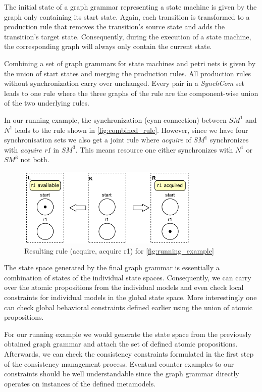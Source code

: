 \documentclass[conference]{IEEEtran}
\begin{document}
The initial state of a graph grammar representing a state machine is given by the graph only containing its start state.
Again, each transition is transformed to a production rule that removes the transition's source state and adds the transition's target state.
Consequently, during the execution of a state machine, the corresponding graph will always only contain the current state.

Combining a set of graph grammars for state machines and petri nets is given by the union of start states and merging the production rules.
All production rules without synchronization carry over unchanged.
Every pair in a \textit{SynchCom} set leads to one rule where the three graphs of the rule are the component-wise union of the two underlying rules.

In our running example, the synchronization (cyan connection) between $SM^1$ and $N^1$ leads to the rule shown in \autoref{fig:combined_rule}.
However, since we have four synchronisation sets we also get a joint rule where \textit{acquire} of $SM^1$ synchronizes with \textit{acquire r1} in $SM^3$.
This means resource one either synchronizes with $N^1$ or $SM^3$ not both.

\begin{figure}[h]
    \centering
    \includegraphics[width=3.4in]{combined_rule}
    \caption{Resulting rule (acquire, acquire r1) for \autoref{fig:running_example}}
    \label{fig:combined_rule}
\end{figure}

The state space generated by the final graph grammar is essentially a combination of states of the individual state spaces.
Consequently, we can carry over the atomic propositions from the individual models and even check local constraints for individual models in the global state space.
More interestingly one can check global behavioral constraints defined earlier using the union of atomic propositions.

For our running example we would generate the state space from the previously obtained graph grammar and attach the set of defined atomic propositions.
Afterwards, we can check the consistency constraints formulated in the first step of the consistency management process.
Eventual counter examples to our constraints should be well understandable since the graph grammar directly operates on instances of the defined metamodels.
\end{document}
